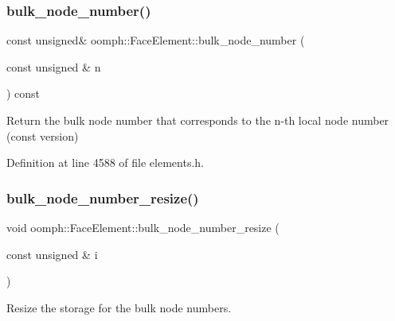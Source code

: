 \mbox{\label{classoomph_1_1FaceElement_ad520ea8561262ec0adc5d9cb8bd2797e}} 
\subsubsection{\texorpdfstring{bulk\+\_\+node\+\_\+number()}{bulk\_node\_number()}\hspace{0.1cm}{\footnotesize\ttfamily [2/2]}}
{\footnotesize\ttfamily const unsigned\& oomph\+::\+Face\+Element\+::bulk\+\_\+node\+\_\+number (\begin{DoxyParamCaption}\item[{const unsigned \&}]{n }\end{DoxyParamCaption}) const\hspace{0.3cm}{\ttfamily [inline]}}



Return the bulk node number that corresponds to the n-\/th local node number (const version) 



Definition at line 4588 of file elements.\+h.

\mbox{\label{classoomph_1_1FaceElement_a2f1891fcc8fc36bd263f62a54d792dac}} 
\subsubsection{\texorpdfstring{bulk\+\_\+node\+\_\+number\+\_\+resize()}{bulk\_node\_number\_resize()}}
{\footnotesize\ttfamily void oomph\+::\+Face\+Element\+::bulk\+\_\+node\+\_\+number\+\_\+resize (\begin{DoxyParamCaption}\item[{const unsigned \&}]{i }\end{DoxyParamCaption})\hspace{0.3cm}{\ttfamily [inline]}}



Resize the storage for the bulk node numbers. 



